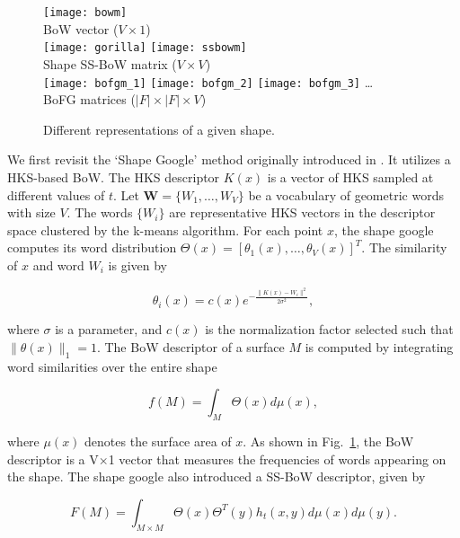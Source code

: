 \begin{figure}
\centering
\texttt{[image: bowm]}\\
BoW vector ($V \times 1$)\\
\texttt{[image: gorilla]}
\hspace{20pt}
\texttt{[image: ssbowm]}\\
\hspace{30pt} Shape \hspace{46pt} SS-BoW matrix ($V \times V$)\\
\texttt{[image: bofgm\_1]}
\texttt{[image: bofgm\_2]}
\texttt{[image: bofgm\_3]}
\dots\\
BoFG matrices ($|F| \times |F| \times V$)
\caption{Different representations of a given shape.}
\label{fig:represent}
\end{figure}

We first revisit the `Shape Google' method originally introduced in \cite{Ovsjanikov:2009}. It utilizes a HKS-based BoW. 
The HKS descriptor $K(x)$ is a vector of HKS sampled at different values of $t$. Let $\textbf{W}=\{W_1,\dots,W_V\}$ be a 
vocabulary of geometric words with size $V$. The words $\{W_i\}$ are representative HKS vectors in the descriptor space 
clustered by the k-means algorithm. For each point $x$, the shape google computes its word distribution 
$\Theta(x)=[\theta_1(x),\dots,\theta_V(x)]^T$. The similarity of $x$ and word $W_i$ is given by

\begin{equation}\label{eq:similar}
\theta_i(x)=c(x)e^{-\frac{\|K(x)-W_i\|^2}{2\sigma^2}},
\end{equation}

where $\sigma$ is a parameter, and $c(x)$ is the normalization factor selected such that $\|\theta(x)\|_1 = 1$. 
The BoW descriptor of a surface $M$ is computed by integrating word similarities over the entire shape

\begin{equation}
f(M)=\int_M\Theta(x)d\mu(x),
\end{equation}

where $\mu(x)$ denotes the surface area of $x$. As shown in Fig.~\ref{fig:represent}, 
the BoW descriptor is a V$\times$1 vector that measures the frequencies of words appearing 
on the shape. The shape google also introduced a SS-BoW descriptor, given by

\begin{equation}
F(M)=\int_{M\times M}\Theta(x)\Theta^T(y)h_t(x,y)d\mu(x)d\mu(y).
\end{equation}

